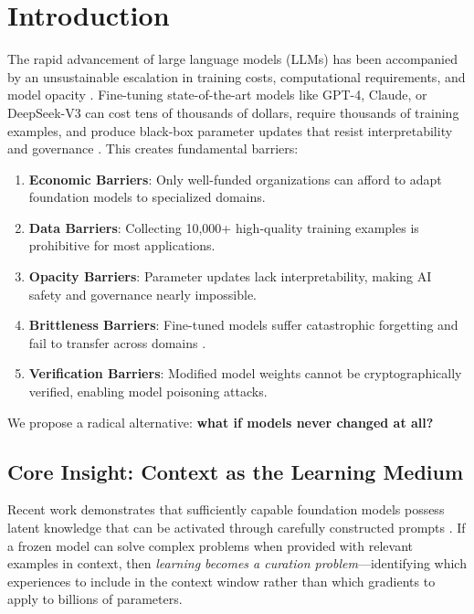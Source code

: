 \section{Introduction}


The rapid advancement of large language models (LLMs) has been accompanied by an unsustainable escalation in training costs, computational requirements, and model opacity \cite{kaplan2020scaling,hoffmann2022training}. Fine-tuning state-of-the-art models like GPT-4, Claude, or DeepSeek-V3 can cost tens of thousands of dollars, require thousands of training examples, and produce black-box parameter updates that resist interpretability and governance \cite{ouyang2022training}. This creates fundamental barriers:

\begin{enumerate}
    \item \textbf{Economic Barriers}: Only well-funded organizations can afford to adapt foundation models to specialized domains.
    \item \textbf{Data Barriers}: Collecting 10,000+ high-quality training examples is prohibitive for most applications.
    \item \textbf{Opacity Barriers}: Parameter updates lack interpretability, making AI safety and governance nearly impossible.
    \item \textbf{Brittleness Barriers}: Fine-tuned models suffer catastrophic forgetting and fail to transfer across domains \cite{kirkpatrick2017overcoming}.
    \item \textbf{Verification Barriers}: Modified model weights cannot be cryptographically verified, enabling model poisoning attacks.
\end{enumerate}

We propose a radical alternative: \textbf{what if models never changed at all?}

\subsection{Core Insight: Context as the Learning Medium}

Recent work demonstrates that sufficiently capable foundation models possess latent knowledge that can be activated through carefully constructed prompts \cite{wei2022chain,yao2023tree,brown2020language}. If a frozen model can solve complex problems when provided with relevant examples in context, then \textit{learning becomes a curation problem}—identifying which experiences to include in the context window rather than which gradients to apply to billions of parameters.

